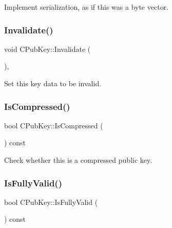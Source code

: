 Implement serialization, as if this was a byte vector. 

\mbox{\label{class_c_pub_key_a99917e80a362af54a3677ea9cf1328ee}} 
\subsubsection{\texorpdfstring{Invalidate()}{Invalidate()}}
{\footnotesize\ttfamily void C\+Pub\+Key\+::\+Invalidate (\begin{DoxyParamCaption}{ }\end{DoxyParamCaption})\hspace{0.3cm}{\ttfamily [inline]}, {\ttfamily [private]}}



Set this key data to be invalid. 

\mbox{\label{class_c_pub_key_a25f8b70340ad20ddab0f80ec4cee9396}} 
\subsubsection{\texorpdfstring{Is\+Compressed()}{IsCompressed()}}
{\footnotesize\ttfamily bool C\+Pub\+Key\+::\+Is\+Compressed (\begin{DoxyParamCaption}{ }\end{DoxyParamCaption}) const\hspace{0.3cm}{\ttfamily [inline]}}



Check whether this is a compressed public key. 

\mbox{\label{class_c_pub_key_a69d8d49962240a5696410229dd83c93e}} 
\subsubsection{\texorpdfstring{Is\+Fully\+Valid()}{IsFullyValid()}}
{\footnotesize\ttfamily bool C\+Pub\+Key\+::\+Is\+Fully\+Valid (\begin{DoxyParamCaption}{ }\end{DoxyParamCaption}) const}



